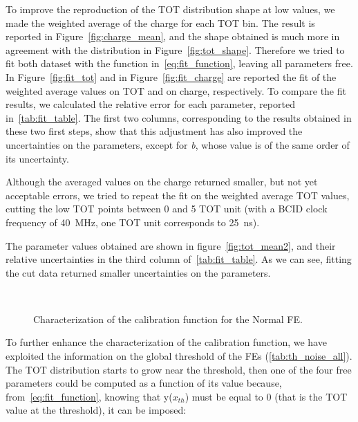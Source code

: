 To improve the reproduction of the TOT distribution shape at low values, we made the weighted average of the charge for each TOT bin. The result is reported in Figure~\autoref{fig:charge_mean}, and the shape obtained is much more in agreement with the distribution in Figure~\autoref{fig:tot_shape}. Therefore we tried to fit both dataset with the function in~\autoref{eq:fit_function}, leaving all parameters free. In Figure~\autoref{fig:fit_tot} and in Figure~\autoref{fig:fit_charge} are reported the fit of the weighted average values on TOT and on charge, respectively. To compare the fit results, we calculated the relative error for each parameter, reported in~\autoref{tab:fit_table}. The first two columns, corresponding to the results obtained in these two first steps, show that this adjustment has also improved the uncertainties on the parameters, except for \textit{b}, whose value is of the same order of its uncertainty.

Although the averaged values on the charge returned smaller, but not yet acceptable errors, we tried to repeat the fit on the weighted average TOT values, cutting the low TOT points between 0 and 5 TOT unit (with a BCID clock frequency of \SI{40}{MHz}, one TOT unit corresponds to \SI{25}{ns}).

The parameter values obtained are shown in figure~\autoref{fig:tot_mean2}, and their relative uncertainties in the third column of~\autoref{tab:fit_table}. As we can see, fitting the cut data returned smaller uncertainties on the parameters. 

\begin{figure}[h!]
\centering
{}\quad
{}\\
\caption{Characterization of the calibration function for the Normal FE.}
\end{figure}


To further enhance the characterization of the calibration function, we have exploited the information on the global threshold of the FEs (\autoref{tab:th_noise_all}).
The TOT distribution starts to grow near the threshold, then one of the four free parameters could be computed as a function of its value because, from~\autoref{eq:fit_function}, knowing that y($x_{th}$) must be equal to 0 (that is the TOT value at the threshold), it can be imposed:

